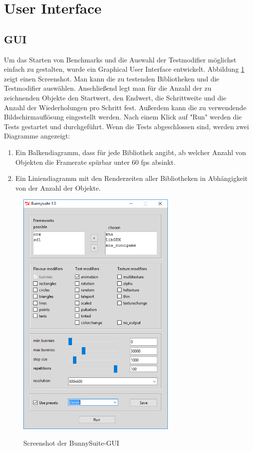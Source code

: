\section{User Interface}
\subsection{GUI}
Um das Starten von Benchmarks und die Auswahl der Testmodifier möglichst einfach zu gestalten, wurde ein Graphical User Interface entwickelt. Abbildung \ref{dia:gui} zeigt einen Screenshot. Man kann die zu testenden Bibliotheken und die Testmodifier auswählen. Anschließend legt man für die Anzahl der zu zeichnenden Objekte den Startwert, den Endwert, die Schrittweite und die Anzahl der Wiederholungen pro Schritt fest. Außerdem kann die zu verwendende Bildschirmauflösung eingestellt werden. Nach einem Klick auf "Run" werden die Tests gestartet und durchgeführt. Wenn die Tests abgeschlossen sind, werden zwei Diagramme angezeigt: 
\begin{enumerate}
\item Ein Balkendiagramm, dass für jede Bibliothek angibt, ab welcher Anzahl von Objekten die Framerate spürbar unter 60 fps absinkt.
\item Ein Liniendiagramm mit den Renderzeiten aller Bibliotheken in Abhängigkeit von der Anzahl der Objekte.
\end{enumerate}

\begin{figure}
\caption{Screenshot der BunnySuite-GUI}
\centering
\includegraphics[width=0.7\textwidth]{gui}
\label{dia:gui}
\end{figure}

